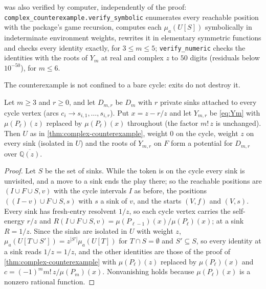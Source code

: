 \documentclass[final]{siamart0516}
\numberwithin{theorem}{section}
\numberwithin{equation}{section}
\theoremstyle{siamnonum}
\theoremstyle{plain}
\newcommand{\code}[1]{{\ttfamily\nolinkurl{#1}}}
\newcommand{\QQ}{\mathbb{Q}}
\newcommand{\Qzbar}{\overline{\QQ(z)}}
\begin{document}
 was also verified by computer, independently of the proof: \code{complex_counterexample.verify_symbolic} enumerates every reachable position with the package's game recursion, computes each $\mu_a(U[S])$ symbolically in indeterminate environment weights, rewrites it in elementary symmetric functions and checks every identity exactly, for $3\le m\le5$; \code{verify_numeric} checks the identities with the roots of $Y_m$ at real and complex $z$ to $50$ digits (residuals below $10^{-50}$), for $m\le6$.

The counterexample is not confined to a bare cycle: exits do not destroy it.

\begin{proposition}\label{prop:sinks}
Let $m\ge3$ and $r\ge0$, and let $D_{m,r}$ be $D_m$ with $r$ private sinks attached to every cycle vertex \textup{(}arcs $c_i\to s_{i,1},\dots,s_{i,r}$\textup{)}. Put $x=z-r/z$ and let $Y_{m,r}$ be \eqref{eq:Ym} with $\mu(P_\ell)(z)$ replaced by $\mu(P_\ell)(x)$ throughout \textup{(}the factor $m!\,z$ is unchanged\textup{)}. Then $U$ as in \cref{thm:complex-counterexample}, weight $0$ on the cycle, weight $z$ on every sink \textup{(}isolated in $U$\textup{)} and the roots of $Y_{m,r}$ on $F$ form a potential for $D_{m,r}$ over $\Qzbar$.
\end{proposition}
\begin{proof}
Let $S$ be the set of sinks. While the token is on the cycle every sink is unvisited, and a move to a sink ends the play there; so the reachable positions are $(I\cup F\cup S,v)$ with the cycle intervals $I$ as before, the positions $((I-v)\cup F\cup S,s)$ with $s$ a sink of $v$, and the starts $(V,f)$ and $(V,s)$. Every sink has fresh-entry resolvent $1/z$, so each cycle vertex carries the self-energy $r/z$ and $R(I\cup F\cup S,v)=\mu(P_{\ell-1})(x)/\mu(P_\ell)(x)$; at a sink $R=1/z$. Since the sinks are isolated in $U$ with weight $z$, $\mu_a(U[T\cup S'])=z^{|S'|}\mu_a(U[T])$ for $T\cap S=\emptyset$ and $S'\subseteq S$, so every identity at a sink reads $1/z=1/z$, and the other identities are those of the proof of \cref{thm:complex-counterexample} with $\mu(P_\ell)(z)$ replaced by $\mu(P_\ell)(x)$ and $c=(-1)^mm!\,z/\mu(P_m)(x)$. Nonvanishing holds because $\mu(P_\ell)(x)$ is a nonzero rational function.
\end{proof}
\end{document}
